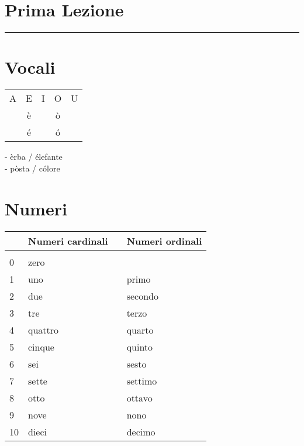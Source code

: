 \documentclass[letter,11pt]{article}
\begin{document}
\section*{\Large{Prima Lezione}}
\noindent\rule{16cm}{1pt}


\section*{Vocali}

\begin{multicols}{2}
\begin{tabular}{ c | c | c | c | c }


  A & E & I & O & U \\
    & è & & ò \\
    & é & & ó \\


\end{tabular}


    - èrba / élefante  \\
    - pòsta / cólore \\

\end{multicols}

\vskip 0.2in

\section*{Numeri}
\vskip 0.2in

\begin{tabular}{ |p{1cm}| p{3cm}| p{0.5cm}| p{3cm}| }
         & Numeri cardinali &  & Numeri ordinali \\
    \hline
    \hline


      &  &  &  \\ \hline
    0 & zero &  &  \\ \hline
    1 & uno &  & primo \\ \hline
    2 & due &  & secondo \\ \hline
    3 & tre &  & terzo \\ \hline
    4 & quattro &  & quarto \\ \hline
    5 & cinque &  & quinto \\ \hline
    6 & sei &  & sesto \\ \hline
    7 & sette &  & settimo \\ \hline
    8 & otto &  & ottavo \\ \hline
    9 & nove &  & nono \\ \hline
    10 & dieci &  & decimo \\ \hline
    \hline
    \end{tabular}
\end{document}
